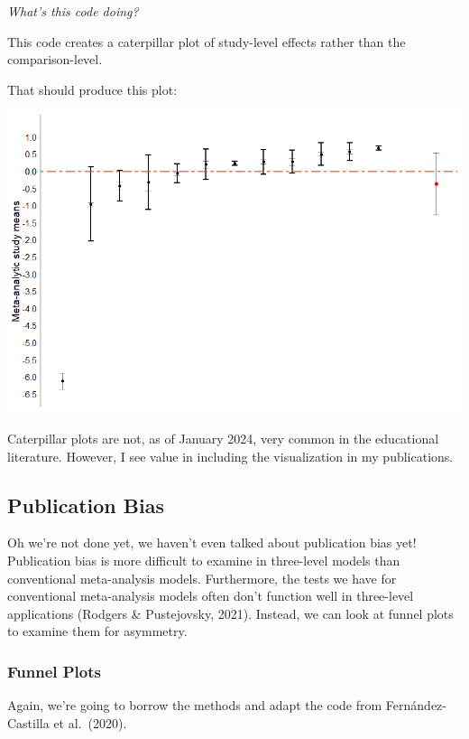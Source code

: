 \documentclass[
]{book}
\begin{document}
\emph{What's this code doing?}

This code creates a caterpillar plot of study-level effects rather than the comparison-level.

That should produce this plot:

\includegraphics[width=1\textwidth,height=\textheight]{images/caterpillar_study.png}

Caterpillar plots are not, as of January 2024, very common in the educational literature. However, I see value in including the visualization in my publications.

\hypertarget{publication-bias-1}{%
\subsection{Publication Bias}\label{publication-bias-1}}

Oh we're not done yet, we haven't even talked about publication bias yet! Publication bias is more difficult to examine in three-level models than conventional meta-analysis models. Furthermore, the tests we have for conventional meta-analysis models often don't function well in three-level applications (Rodgers \& Pustejovsky, 2021)\citep{rodgers2021}. Instead, we can look at funnel plots to examine them for asymmetry.

\hypertarget{funnel-plots}{%
\subsubsection{Funnel Plots}\label{funnel-plots}}

Again, we're going to borrow the methods and adapt the code from Fernández-Castilla et al.~(2020)\citep{fernández-castilla2020}.
\end{document}
